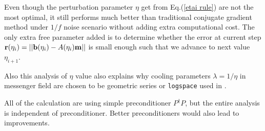 \documentclass[twocolumn,linenumbers]{aastex631}
\newcommand{\vbd}{\vb{d}}
\newcommand{\vbm}{\vb{m}}
\newcommand{\vbb}{\vb{b}}
\newcommand{\inv}[1]{#1^{-1}}
\newcommand{\hatm}{\vb{\hat{m}}}
\newcommand{\Pdagger}{P^{\dagger}}
\newcommand{\Nbar}{\bar{N}}
\newcommand{\PPinv}[1]{\inv{\qty(\Pdagger #1 P)}}
\begin{document}
%

Even though the perturbation parameter $\eta$ get from Eq.(\ref{etai rule}) are
not the most optimal,
it still performs much better than traditional conjugate gradient method under
$1/f$ noise scenario without adding extra computational cost.
The only extra free parameter added is to determine whether the error at
current step $\vb{r}(\eta_i) = \qty||\vbb(\eta_i) - A(\eta_i) \vbm||$ is small
enough such that we advance to next value $\eta_{i+1}$.


Also this analysis of $\eta$ value also explains why cooling parameters
$\lambda=1/\eta$ in messenger field are chosen to be geometric series or
\texttt{logspace} used in \cite{Huffenberger_2018}.

All of the calculation are using simple preconditioner $\Pdagger P$, but 
the entire analysis is independent of preconditioner.
Better preconditioners would also lead to improvements.
\end{document}
